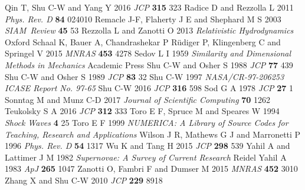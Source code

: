 \documentclass[letterpaper]{jpconf}
\begin{document}
\begin{thebibliography}{36}
   Qin T, Shu C-W and Yang Y 2016 {\it JCP} {\bf 315} 323
   Radice D and Rezzolla L 2011 {\it Phys. Rev. D} {\bf 84} 024010
   Remacle J-F, Flaherty J E and Shephard M S 2003 {\it SIAM~Review} {\bf 45} 53
   Rezzolla L and Zanotti O 2013 {\it Relativistic Hydrodynamics} Oxford
   Schaal K, Bauer A, Chandrashekar P R{\"u}diger P, Klingenberg C and Springel V 2015 {\it MNRAS} {\bf 453} 4278
   Sedov L I 1959 {\it Similarity and Dimensional Methods in Mechanics} Academic Press
   Shu C-W and Osher S 1988 {\it JCP} {\bf 77} 439
   Shu C-W and Osher S 1989 {\it JCP} {\bf 83} 32
   Shu C-W 1997 {\it NASA/CR-97-206253 ICASE Report No. 97-65}
   Shu C-W 2016 {\it JCP} {\bf 316} 598
   Sod G A 1978 {\it JCP} {\bf 27} 1
   Sonntag M and Munz C-D 2017 {\it Journal of Scientific Computing} {\bf 70} 1262
   Teukolsky S A 2016 {\it JCP} {\bf 312} 333
   Toro E F, Spruce M and Speares W 1994 {\it Shock Waves} {\bf 4} 25
   Toro E F 1999 {\it NUMERICA: A Library of Source Codes for Teaching, Research and Applications}
   Wilson J R, Mathews G J and Marronetti P 1996 {\it Phys. Rev. D} {\bf 54} 1317
   Wu K and Tang H 2015 {\it JCP} {\bf 298} 539
   Yahil A and Lattimer J M 1982 {\it Supernovae: A Survey of Current Research} Reidel
   Yahil A 1983 {\it ApJ} {\bf 265} 1047
   Zanotti O, Fambri F and Dumser M 2015 {\it MNRAS} {\bf 452} 3010
   Zhang X and Shu C-W 2010 {\it JCP} {\bf 229} 8918
\end{thebibliography}
\end{document}
